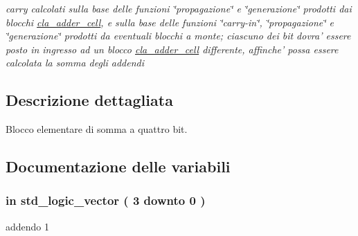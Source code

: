 \begin{DoxyCompactItemize}
\begin{DoxyCompactList}\small\item\em carry calcolati sulla base delle funzioni \char`\"{}propagazione\char`\"{} e \char`\"{}generazione\char`\"{} prodotti dai blocchi \hyperlink{classcla__adder__cell}{cla\+\_\+adder\+\_\+cell}, e sulla base delle funzioni \char`\"{}carry-\/in\char`\"{}, \char`\"{}propagazione\char`\"{} e \char`\"{}generazione\char`\"{} prodotti da eventuali blocchi a monte; ciascuno dei bit dovra' essere posto in ingresso ad un blocco \hyperlink{classcla__adder__cell}{cla\+\_\+adder\+\_\+cell} differente, affinche' possa essere calcolata la somma degli addendi \end{DoxyCompactList}\end{DoxyCompactItemize}


\subsection{Descrizione dettagliata}
Blocco elementare di somma a quattro bit. 



\subsection{Documentazione delle variabili}
\hypertarget{group___nibble_adder_ga2c8945f4747b9a5448412c95fc281c87}{
\subsubsection[{addendum1}]{ {\bfseries \textcolor{vhdlchar}{in}\textcolor{vhdlchar}{ }} {\bfseries \textcolor{vhdlchar}{std\+\_\+logic\+\_\+vector}\textcolor{vhdlchar}{ }\textcolor{vhdlchar}{(}\textcolor{vhdlchar}{ }\textcolor{vhdlchar}{ } \textcolor{vhdldigit}{3} \textcolor{vhdlchar}{ }\textcolor{vhdlchar}{downto}\textcolor{vhdlchar}{ }\textcolor{vhdlchar}{ } \textcolor{vhdldigit}{0} \textcolor{vhdlchar}{ }\textcolor{vhdlchar}{)}\textcolor{vhdlchar}{ }} \hspace{0.3cm}{\ttfamily [Port]}}}\label{group___nibble_adder_ga2c8945f4747b9a5448412c95fc281c87}


addendo 1 

